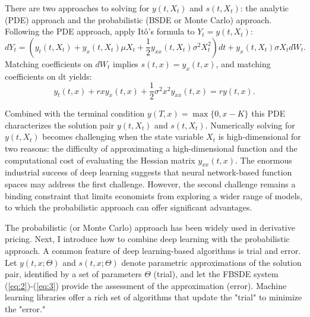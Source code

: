 \documentclass{article}
\begin{document}
There are two approaches to solving for $y(t,X_{t})$ and $s(t,X_{t})$: the analytic (PDE) approach and the probabilistic (BSDE or Monte Carlo) approach. Following the PDE approach, apply Itô's formula to $Y_{t}=y(t,X_{t})$:
\[
dY_{t}=\left(y_{t}(t,X_{t})+y_{x}(t,X_{t})\mu X_{t}+\frac{1}{2}y_{xx}(t,X_{t})\sigma^{2}X_{t}^{2}\right)dt+y_{x}(t,X_{t})\sigma X_{t}dW_{t}.
\]
Matching coefficients on $dW_{t}$ implies $s(t,x)=y_{x}(t,x)$, and matching coefficients on dt yields:
\begin{equation}
y_{t}(t,x)+rxy_{x}(t,x)+\frac{1}{2}\sigma^{2}x^{2}y_{xx}(t,x)=ry(t,x).
\label{eq:4}
\end{equation}

\clearpage

Combined with the terminal condition $y(T,x)=\max\{0,x-K\}$ this PDE characterizes the solution pair $y(t,X_{t})$ and $s(t,X_{t})$. Numerically solving for $y(t,X_{t})$ becomes challenging when the state variable $X_{t}$ is high-dimensional for two reasons: the difficulty of approximating a high-dimensional function and the computational cost of evaluating the Hessian matrix $y_{xx}(t,x)$. The enormous industrial success of deep learning suggests that neural network-based function spaces may address the first challenge. However, the second challenge remains a binding constraint that limits economists from exploring a wider range of models, to which the probabilistic approach can offer significant advantages.

The probabilistic (or Monte Carlo) approach has been widely used in derivative pricing. Next, I introduce how to combine deep learning with the probabilistic approach. A common feature of deep learning-based algorithms is trial and error. Let $y(t,x;\Theta)$ and $s(t,x;\Theta)$ denote parametric approximations of the solution pair, identified by a set of parameters $\Theta$ (trial), and let the FBSDE system (\ref{eq:2})-(\ref{eq:3}) provide the assessment of the approximation (error). Machine learning libraries offer a rich set of algorithms that update the "trial" to minimize the "error."
\end{document}

